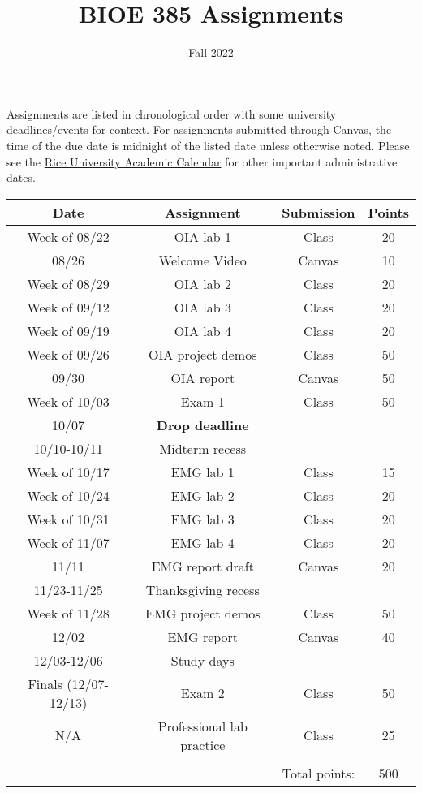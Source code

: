 \documentclass{article}
\title{BIOE 385 Assignments}
\author{Fall 2022}
\date{}
\begin{document}
\maketitle
Assignments are listed in chronological order with some university deadlines/events for context. For assignments submitted through Canvas, the time of the due date is midnight of the listed date unless otherwise noted. Please see the \href{https://registrar.rice.edu/calendars/fall-semester-2022}{Rice University Academic Calendar} for other important administrative dates.\\

\begin{table}[h!]
	\centering
\begin{tabular}[h!]{cccc}
\toprule
	Date & Assignment & Submission & Points\\
	\midrule
	Week of 08/22 & OIA lab 1 & Class & 20\\
	08/26 & Welcome Video & Canvas & 10\\
	Week of 08/29 & OIA lab 2 & Class & 20\\
	Week of 09/12 & OIA lab 3 & Class & 20\\
	Week of 09/19 & OIA lab 4 & Class & 20\\
	Week of 09/26 & OIA project demos & Class & 50\\
	09/30 & OIA report & Canvas & 50\\
	Week of 10/03 & Exam 1 & Class & 50\\
	\midrule
	10/07 & \textbf{Drop deadline} & &\\
	10/10-10/11 & Midterm recess & &\\
	\midrule
	Week of 10/17 & EMG lab 1 & Class & 15\\
	Week of 10/24 & EMG lab 2 & Class & 20\\
	Week of 10/31 & EMG lab 3 & Class & 20\\
	Week of 11/07 & EMG lab 4 & Class & 20\\
	11/11 & EMG report draft & Canvas & 20\\
	\midrule
	11/23-11/25 & Thanksgiving recess & &\\
	\midrule
	Week of 11/28 & EMG project demos & Class & 50\\
	12/02 & EMG report & Canvas & 40\\
	\midrule
	12/03-12/06 & Study days & &\\
	\midrule
	Finals (12/07-12/13) & Exam 2 & Class & 50\\
	N/A & Professional lab practice & Class & 25\\
	\bottomrule
	\\
	& & Total points: & 500\\
\end{tabular}
\end{table}
\end{document}
